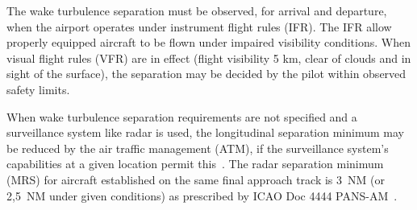 \begin{table}[h]
\centering
{}
\caption[ICAO wake turbulence categories and separation minima]{ICAO wake turbulence categories and separation minima to avoid wake vortex encounter.(*) indicate radar separation minimum (MRS)~\cite{noauthor_recat_2018, rooseleer2015recat}.} \label{tab:ICAO_WTC}
\end{table}

The wake turbulence separation must be observed, for arrival and departure, when the airport operates under instrument flight rules (IFR). The IFR allow properly equipped aircraft to be flown under impaired visibility conditions. When visual flight rules (VFR) are in effect (flight visibility 5 km, clear of clouds and in sight of the surface), the separation may be decided by the pilot within observed safety limits.~\cite{gerz_commercial_2002, icao_annex_2005} 

When wake turbulence separation requirements are not specified and a surveillance system like radar is used, the longitudinal separation minimum may be reduced by the air traffic management (ATM), if the surveillance system's capabilities at a given location permit this~\cite{MRS_separation_standard}. The radar separation minimum (MRS) for aircraft established on the same final approach track is 3~NM (or 2,5~NM under given conditions) as prescribed by ICAO Doc 4444 PANS-AM~\cite{doc44444}.

